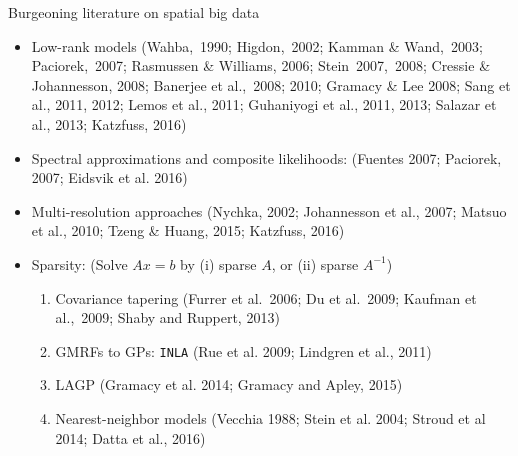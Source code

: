 \begin{frame}{Burgeoning literature on spatial big data}

{\small
\begin{itemize}\setlength{\itemsep}{0.cm}
\item Low-rank models (Wahba,\ 1990; Higdon,\ 2002; Kamman \& Wand,\ 2003; Paciorek,\ 2007; Rasmussen \& Williams, 2006; Stein\ 2007,\ 2008; Cressie \& Johannesson, 2008; Banerjee et al.,\ 2008; 2010; Gramacy \& Lee 2008; Sang et al., 2011, 2012; Lemos et al., 2011; Guhaniyogi et al., 2011, 2013; Salazar et al., 2013; Katzfuss, 2016) 

\item Spectral approximations and composite likelihoods: (Fuentes 2007; Paciorek, 2007; Eidsvik et al. 2016)


\item Multi-resolution approaches (Nychka, 2002; Johannesson et al., 2007; Matsuo et al., 2010; Tzeng \& Huang, 2015; Katzfuss, 2016)

\item Sparsity: (Solve $Ax=b$ by (i) sparse $A$, or (ii) sparse $A^{-1}$)
\begin{enumerate}
 \item Covariance tapering (Furrer et al.\ 2006; Du et al.\ 2009; Kaufman et al.,\ 2009; Shaby and Ruppert, 2013)

 \item GMRFs to GPs: \texttt{INLA} (Rue et al. 2009; Lindgren et al., 2011)

 \item LAGP (Gramacy et al. 2014; Gramacy and Apley, 2015)

 \item Nearest-neighbor models (Vecchia 1988; Stein et al. 2004; Stroud et al 2014; Datta et al., 2016)
\end{enumerate}

\end{itemize}
}
\end{frame}

